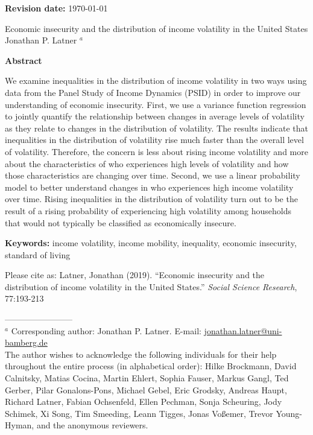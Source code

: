 \documentclass[12pt]{article}
\begin{document}
\afterpage{\cfoot{\thepage}}

{\bf  Revision date:} \today

\begin{center}
\large Economic insecurity and the distribution of income volatility in the United States \\
\bigskip
\normalsize
Jonathan P. Latner $^{a}$\\
\end{center}

{\bf  Abstract}

We examine inequalities in the distribution of income volatility in two ways using data from the Panel Study of Income Dynamics (PSID) in order to improve our understanding of economic insecurity.  First, we use a variance function regression to jointly quantify the relationship between changes in average levels of volatility as they relate to changes in the distribution of volatility. The results indicate that inequalities in the distribution of volatility rise much faster than the overall level of volatility.  Therefore, the concern is less about rising income volatility and more about the characteristics of who experiences high levels of volatility and how those characteristics are changing over time.  Second, we use a linear probability model to better understand changes in who experiences high income volatility over time.  Rising inequalities in the distribution of volatility turn out to be the result of a rising probability of experiencing high volatility among households that would not typically be classified as economically insecure.  

{\bf  Keywords:} income volatility, income mobility, inequality, economic insecurity, standard of living

Please cite as: Latner, Jonathan (2019).  ``Economic insecurity and the distribution of income volatility in the United States.'' \emph{Social Science Research}, 77:193-213

\vfill

------------------------ \\
\footnotesize
$^{a}$ Corresponding author: Jonathan P. Latner.  E-mail:  \url{jonathan.latner@uni-bamberg.de}\\
The author wishes to acknowledge the following individuals for their help throughout the entire process (in alphabetical order):  Hilke Brockmann, David Calnitsky, Matias Cocina, Martin Ehlert, Sophia Fauser, Markus Gangl, Ted Gerber, Pilar Gonalons-Pons, Michael Gebel, Eric Grodsky, Andreas Haupt, Richard Latner, Fabian Ochsenfeld, Ellen Pechman, Sonja Scheuring, Jody Schimek, Xi Song, Tim Smeeding, Leann Tigges, Jonas Vo{\ss}emer, Trevor Young-Hyman, and the anonymous reviewers.
\end{document}
